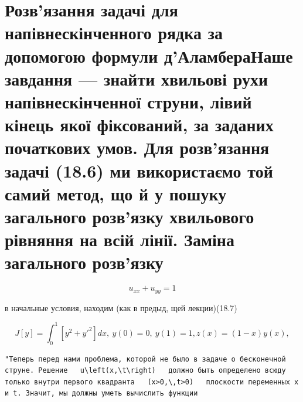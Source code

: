 \documentclass[
  ukrainian,
]{article}
\begin{document}
\section{Розв'язання задачі для напівнескінченного рядка за допомогою
формули д'АламбераНаше завдання --- знайти хвильові рухи
напівнескінченної струни, лівий кінець якої фіксований, за заданих
початкових умов. Для розв'язання задачі (18.6) ми використаємо той самий
метод, що й у пошуку загального розв'язку хвильового рівняння на всій
лінії. Заміна загального
розв'язку}\label{ux440ux43eux437ux432ux44fux437ux430ux43dux43dux44f-ux437ux430ux434ux430ux447ux456-ux434ux43bux44f-ux43dux430ux43fux456ux432ux43dux435ux441ux43aux456ux43dux447ux435ux43dux43dux43eux433ux43e-ux440ux44fux434ux43aux430-ux437ux430-ux434ux43eux43fux43eux43cux43eux433ux43eux44e-ux444ux43eux440ux43cux443ux43bux438-ux434ux430ux43bux430ux43cux431ux435ux440ux430ux43dux430ux448ux435-ux437ux430ux432ux434ux430ux43dux43dux44f-ux437ux43dux430ux439ux442ux438-ux445ux432ux438ux43bux44cux43eux432ux456-ux440ux443ux445ux438-ux43dux430ux43fux456ux432ux43dux435ux441ux43aux456ux43dux447ux435ux43dux43dux43eux457-ux441ux442ux440ux443ux43dux438-ux43bux456ux432ux438ux439-ux43aux456ux43dux435ux446ux44c-ux44fux43aux43eux457-ux444ux456ux43aux441ux43eux432ux430ux43dux438ux439-ux437ux430-ux437ux430ux434ux430ux43dux438ux445-ux43fux43eux447ux430ux442ux43aux43eux432ux438ux445-ux443ux43cux43eux432.-ux434ux43bux44f-ux440ux43eux437ux432ux44fux437ux430ux43dux43dux44f-ux437ux430ux434ux430ux447ux456-18.6-ux43cux438-ux432ux438ux43aux43eux440ux438ux441ux442ux430ux454ux43cux43e-ux442ux43eux439-ux441ux430ux43cux438ux439-ux43cux435ux442ux43eux434-ux449ux43e-ux439-ux443-ux43fux43eux448ux443ux43aux443-ux437ux430ux433ux430ux43bux44cux43dux43eux433ux43e-ux440ux43eux437ux432ux44fux437ux43aux443-ux445ux432ux438ux43bux44cux43eux432ux43eux433ux43e-ux440ux456ux432ux43dux44fux43dux43dux44f-ux43dux430-ux432ux441ux456ux439-ux43bux456ux43dux456ux457.-ux437ux430ux43cux456ux43dux430-ux437ux430ux433ux430ux43bux44cux43dux43eux433ux43e-ux440ux43eux437ux432ux44fux437ux43aux443}

\[
u_{xx} + u_{yy} = 1
\]

в начальные условия, находим (как в предыд, щей лекции)(18.7)

\[
J[y] = \int_{0}^{1} [y^{2} + {y'}^{2}] dx, \ y(0) = 0, \ y(1) = 1,
z(x) = (1 - x) y(x),
\]

\begin{verbatim}
"Теперь перед нами проблема, которой не было в задаче о бесконечной струне. Решение   u\left(x,\t\right)   должно быть определено всюду только внутри первого квадранта   (x>0,\,t>0)   плоскости переменных x и t. Значит, мы должны уметь вычислить функции
\end{verbatim}
\end{document}
